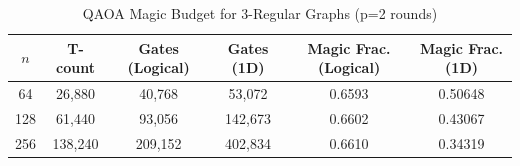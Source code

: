 
\begin{table}[h]
\centering
\caption{QAOA Magic Budget for 3-Regular Graphs (p=2 rounds)}
\label{tab:qaoa-benchmarks}
\begin{tabular}{|c|c|c|c|c|c|}
\hline
$n$ & T-count & Gates (Logical) & Gates (1D) & Magic Frac. (Logical) & Magic Frac. (1D) \\
\hline
64 & 26,880 & 40,768 & 53,072 & 0.6593 & 0.50648 \\
128 & 61,440 & 93,056 & 142,673 & 0.6602 & 0.43067 \\
256 & 138,240 & 209,152 & 402,834 & 0.6610 & 0.34319 \\

\hline
\end{tabular}
\end{table}

